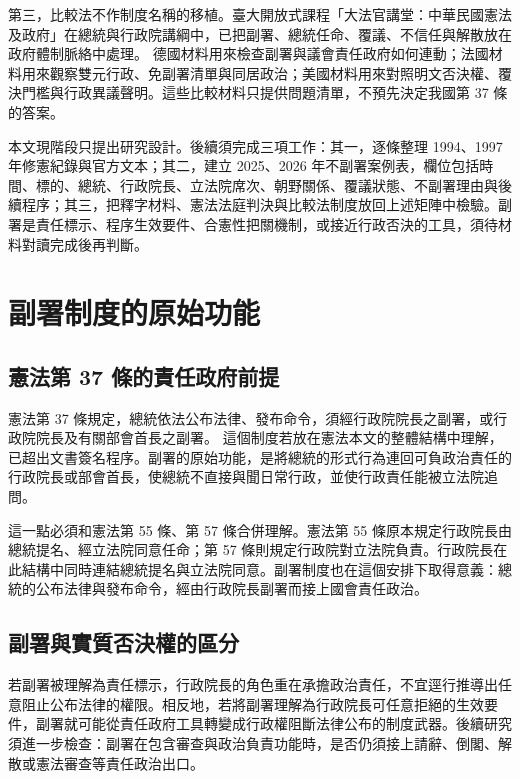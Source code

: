 \documentclass[12pt]{ctexart}
\begin{document}
第三，比較法不作制度名稱的移植。臺大開放式課程「大法官講堂：中華民國憲法及政府」在總統與行政院講綱中，已把副署、總統任命、覆議、不信任與解散放在政府體制脈絡中處理。\autocites{ntu_ocw_separation_lecture}{ntu_ocw_executive_yuan_lecture} 德國材料用來檢查副署與議會責任政府如何連動；法國材料用來觀察雙元行政、免副署清單與同居政治；美國材料用來對照明文否決權、覆決門檻與行政異議聲明。這些比較材料只提供問題清單，不預先決定我國第 37 條的答案。

本文現階段只提出研究設計。後續須完成三項工作：其一，逐條整理 1994、1997 年修憲紀錄與官方文本；其二，建立 2025、2026 年不副署案例表，欄位包括時間、標的、總統、行政院長、立法院席次、朝野關係、覆議狀態、不副署理由與後續程序；其三，把釋字材料、憲法法庭判決與比較法制度放回上述矩陣中檢驗。副署是責任標示、程序生效要件、合憲性把關機制，或接近行政否決的工具，須待材料對讀完成後再判斷。

\section{副署制度的原始功能}

\subsection{憲法第 37 條的責任政府前提}

憲法第 37 條規定，總統依法公布法律、發布命令，須經行政院院長之副署，或行政院院長及有關部會首長之副署。\autocite{roc_constitution_moj} 這個制度若放在憲法本文的整體結構中理解，已超出文書簽名程序。副署的原始功能，是將總統的形式行為連回可負政治責任的行政院長或部會首長，使總統不直接與聞日常行政，並使行政責任能被立法院追問。

這一點必須和憲法第 55 條、第 57 條合併理解。憲法第 55 條原本規定行政院長由總統提名、經立法院同意任命；第 57 條則規定行政院對立法院負責。行政院長在此結構中同時連結總統提名與立法院同意。副署制度也在這個安排下取得意義：總統的公布法律與發布命令，經由行政院長副署而接上國會責任政治。

\subsection{副署與實質否決權的區分}

若副署被理解為責任標示，行政院長的角色重在承擔政治責任，不宜逕行推導出任意阻止公布法律的權限。相反地，若將副署理解為行政院長可任意拒絕的生效要件，副署就可能從責任政府工具轉變成行政權阻斷法律公布的制度武器。後續研究須進一步檢查：副署在包含審查與政治負責功能時，是否仍須接上請辭、倒閣、解散或憲法審查等責任政治出口。
\end{document}
